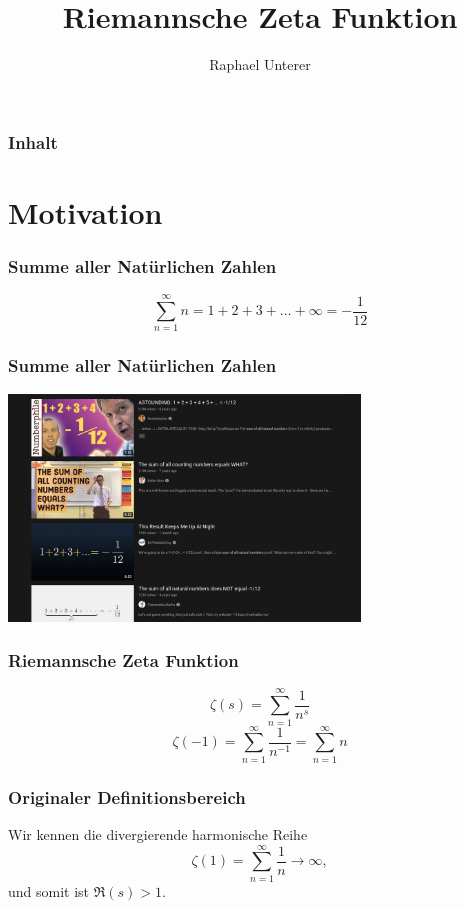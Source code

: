 \documentclass[ngerman, aspectratio=169]{beamer}
\title{Riemannsche Zeta Funktion}
\author{Raphael Unterer}
\institute{Mathematisches Seminar 2022: Spezielle Funktionen}
\begin{document}
	\begin{frame}
		\titlepage
	\end{frame}

	\begin{frame}
		\frametitle{Inhalt}
		\tableofcontents
	\end{frame}

	\section{Motivation}

    \begin{frame}
        \frametitle{Summe aller Natürlichen Zahlen}
        \begin{equation*}
            \sum_{n=1}^{\infty} n
            =
            1 + 2 + 3 + \ldots + \infty
            =
            - \frac{1}{12}
        \end{equation*}
    \end{frame}
    \begin{frame}
        \frametitle{Summe aller Natürlichen Zahlen}
        \begin{center}
            \includegraphics[width=0.7\textwidth]{youtube_screenshot.png}
        \end{center}
    \end{frame}
    \begin{frame}
        \frametitle{Riemannsche Zeta Funktion}
        \begin{equation*}
            \zeta(s)
            =
            \sum_{n=1}^{\infty}
            \frac{1}{n^s}
        \end{equation*}
        \pause
        \begin{equation*}
            \zeta(-1)
            =
            \sum_{n=1}^{\infty}
            \frac{1}{n^{-1}}
            =
            \sum_{n=1}^{\infty} n
        \end{equation*}
    \end{frame}
    \begin{frame}
        \frametitle{Originaler Definitionsbereich}
        Wir kennen die divergierende harmonische Reihe
        \begin{equation*}
            \zeta(1)
            =
            \sum_{n=1}^{\infty}
            \frac{1}{n}
            \rightarrow
            \infty,
        \end{equation*}
        und somit ist $\Re(s) > 1$.
    \end{frame}
\end{document}
